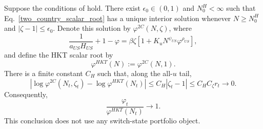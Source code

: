 \documentclass{article}
\begin{document}
\begin{coro}\label{cor_hkt_terminal_closure}
Suppose the conditions of  hold.  There exist $\epsilon_0\in(0,1)$ and $N_0^H<\infty$ such that Eq.~\eqref{two_country_scalar_root} has a unique interior solution whenever $N\ge N_0^H$ and $|\zeta-1|\le\epsilon_0$.  Denote this solution by $\varphi^{2C}(N,\zeta)$, where
\begin{equation}\label{two_country_scalar_root}
\frac{1}{a_{US}H_{US}}+1-\varphi
=
\beta\zeta
\left[1+K_uN^{\psi_{US}}\varphi^{\rho_{US}}\right],
\end{equation}
and define the HKT scalar root by
\[
\varphi^{HKT}(N):=\varphi^{2C}(N,1).
\]
There is a finite constant $C_H$ such that, along the all-$u$ tail,
\begin{equation}\label{hkt_terminal_log_gap}
\left|
\log\varphi^{2C}(N_t,\zeta_t)
-\log\varphi^{HKT}(N_t)
\right|
\le
C_H|\zeta_t-1|
\le
C_HC_\zeta r_t
\longrightarrow0.
\end{equation}
Consequently,
\begin{equation}\label{hkt_terminal_ratio}
\frac{\varphi_t}{\varphi^{HKT}(N_t)}\longrightarrow1.
\end{equation}
This conclusion does not use any switch-state portfolio object.
\end{coro}
\end{document}
